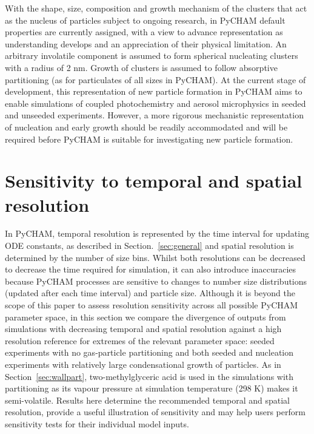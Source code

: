 \documentclass[gmd, manuscript]{copernicus}
\begin{document}
With the shape, size, composition and growth mechanism of the clusters that act as the nucleus of particles subject to ongoing research, in PyCHAM default properties are currently  assigned, with a view to advance representation as understanding develops and an appreciation of their physical limitation.  An arbitrary involatile component is assumed to form spherical nucleating clusters with a radius of 2 nm.  Growth of clusters is assumed to follow absorptive partitioning (as for particulates of all sizes in PyCHAM).  At the current stage of development, this representation of new particle formation in PyCHAM aims to enable simulations of coupled photochemistry and aerosol microphysics in seeded and unseeded experiments.  However, a more rigorous mechanistic representation of nucleation and early growth should be readily accommodated and will be required before PyCHAM is suitable for investigating new particle formation.

\section{Sensitivity to temporal and spatial resolution}\label{sec:tr_tests}

In PyCHAM, temporal resolution is represented by the time interval for updating ODE constants, as described in Section.~\ref{sec:general} and spatial resolution is determined by the number of size bins.  Whilst both resolutions can be decreased to decrease the time required for simulation, it can also introduce inaccuracies because PyCHAM processes are sensitive to changes to number size distributions (updated after each time interval) and particle size.  Although it is beyond the scope of this paper to assess resolution sensitivity across all possible PyCHAM parameter space, in this section we compare the divergence of outputs from simulations with decreasing temporal and spatial resolution against a high resolution reference for extremes of the relevant parameter space: seeded experiments with no gas-particle partitioning and both seeded and nucleation experiments with relatively large condensational growth of particles.  As in Section~\ref{sec:wallpart}, two-methylglyceric acid is used in the simulations with partitioning as its vapour pressure at simulation temperature (298 K) makes it semi-volatile.  Results here determine the recommended temporal and spatial resolution, provide a useful illustration of sensitivity and may help users perform sensitivity tests for their individual model inputs.
\end{document}
